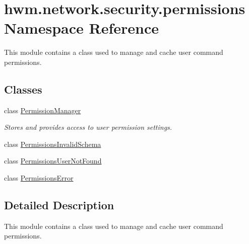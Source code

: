 \hypertarget{namespacehwm_1_1network_1_1security_1_1permissions}{\section{hwm.\-network.\-security.\-permissions Namespace Reference}
\label{namespacehwm_1_1network_1_1security_1_1permissions}
}


This module contains a class used to manage and cache user command permissions.  


\subsection*{Classes}
\begin{DoxyCompactItemize}
\item 
class \hyperlink{classhwm_1_1network_1_1security_1_1permissions_1_1_permission_manager}{Permission\-Manager}
\begin{DoxyCompactList}\small\item\em Stores and provides access to user permission settings. \end{DoxyCompactList}\item 
class \hyperlink{classhwm_1_1network_1_1security_1_1permissions_1_1_permissions_invalid_schema}{Permissions\-Invalid\-Schema}
\item 
class \hyperlink{classhwm_1_1network_1_1security_1_1permissions_1_1_permissions_user_not_found}{Permissions\-User\-Not\-Found}
\item 
class \hyperlink{classhwm_1_1network_1_1security_1_1permissions_1_1_permissions_error}{Permissions\-Error}
\end{DoxyCompactItemize}


\subsection{Detailed Description}
This module contains a class used to manage and cache user command permissions. 